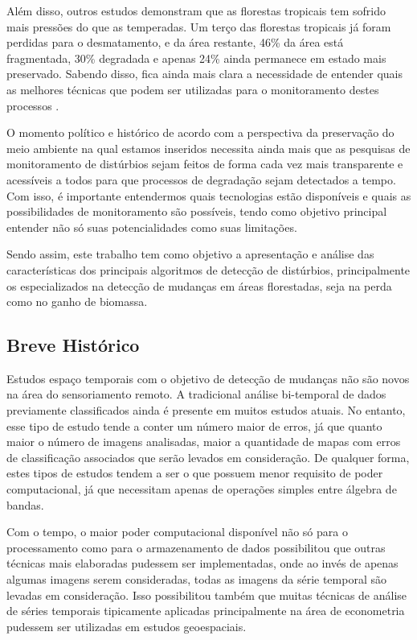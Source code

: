 Além disso, outros estudos demonstram que as florestas tropicais tem sofrido mais pressões do que as temperadas. Um terço das florestas tropicais já foram perdidas para o desmatamento, e da área restante, 46\% da área está fragmentada, 30\% degradada e apenas 24\% ainda permanece em estado mais preservado. Sabendo disso, fica ainda mais clara a necessidade de entender quais as melhores técnicas que podem ser utilizadas para o monitoramento destes processos \citep{Hirschmugl2017}. 

O momento político e histórico de acordo com a perspectiva da preservação do meio ambiente na qual estamos inseridos necessita ainda mais que as pesquisas de monitoramento de distúrbios sejam feitos de forma cada vez mais transparente e acessíveis a todos para que processos de degradação sejam detectados a tempo. Com isso, é importante entendermos quais tecnologias estão disponíveis e quais as possibilidades de monitoramento são possíveis, tendo como objetivo principal entender não só suas potencialidades como suas limitações. 

Sendo assim, este trabalho tem como objetivo a apresentação e análise das características dos principais algoritmos de detecção de distúrbios, principalmente os especializados na detecção de mudanças em áreas florestadas, seja na perda como no ganho de biomassa.


\subsection{Breve Histórico}

\hspace{13pt} Estudos espaço temporais com o objetivo de detecção de mudanças não são novos na área do sensoriamento remoto. A tradicional análise bi-temporal de dados previamente classificados ainda é presente em muitos estudos atuais. No entanto, esse tipo de estudo tende a conter um número maior de erros, já que quanto maior o número de imagens analisadas, maior a quantidade de mapas com erros de classificação associados que serão levados em consideração. De qualquer forma, estes tipos de estudos tendem a ser o que possuem menor requisito de poder computacional, já que necessitam apenas de operações simples entre álgebra de bandas.

Com o tempo, o maior poder computacional disponível não só para o processamento como para o armazenamento de dados possibilitou que outras técnicas mais elaboradas pudessem ser implementadas, onde ao invés de apenas algumas imagens serem consideradas, todas as imagens da série temporal são levadas em consideração. Isso possibilitou também que muitas técnicas de análise de séries temporais tipicamente aplicadas principalmente na área de econometria pudessem ser utilizadas em estudos geoespaciais.

